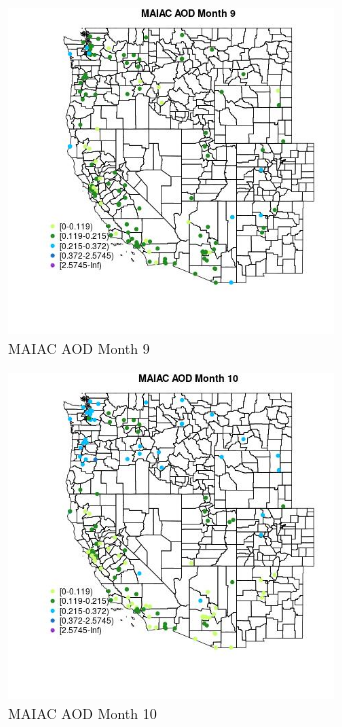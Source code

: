 \begin{figure} 
\centering  
\includegraphics[width=0.77\textwidth]{Code_Outputs/Report_ML_input_PM25_Step4_part_e_de_duplicated_aves_MapObsMo9MAIAC_AOD.jpg} 
\caption{\label{fig:Report_ML_input_PM25_Step4_part_e_de_duplicated_avesMapObsMo9MAIAC_AOD}MAIAC AOD Month 9} 
\end{figure} 
 

\begin{figure} 
\centering  
\includegraphics[width=0.77\textwidth]{Code_Outputs/Report_ML_input_PM25_Step4_part_e_de_duplicated_aves_MapObsMo10MAIAC_AOD.jpg} 
\caption{\label{fig:Report_ML_input_PM25_Step4_part_e_de_duplicated_avesMapObsMo10MAIAC_AOD}MAIAC AOD Month 10} 
\end{figure} 
 

